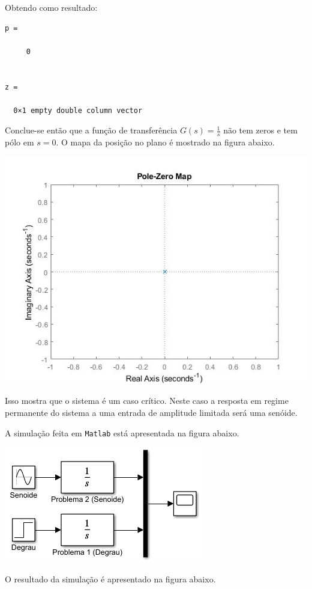 \documentclass[
]{book}
\theoremstyle{definition}
\theoremstyle{definition}
\theoremstyle{definition}
\theoremstyle{remark}
\begin{document}
Obtendo como resultado:

\begin{verbatim}
p =

     0


z =

  0×1 empty double column vector
\end{verbatim}

Conclue-se então que a função de transferência \(G(s) = \frac {1}{s}\) não tem zeros e tem pólo em \(s = 0\). O mapa da posição no plano é mostrado na figura abaixo.

\includegraphics{Imagens/Lab2/prob2.jpg}

Isso mostra que o sistema é um caso crítico. Neste caso a resposta em regime permanente do sistema a uma entrada de amplitude limitada será uma senóide.

A simulação feita em \texttt{Matlab} está apresentada na figura abaixo.

\includegraphics{Imagens/Lab2/simP2.jpg}

O resultado da simulação é apresentado na figura abaixo.
\end{document}

